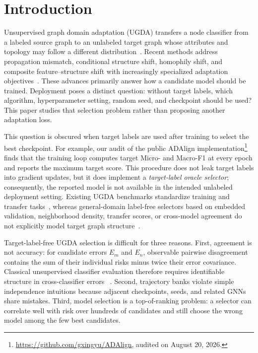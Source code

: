 \section{Introduction}
\label{sec:introduction}

Unsupervised graph domain adaptation (UGDA) transfers a node classifier from a
labeled source graph to an unlabeled target graph whose attributes and topology
may follow a different distribution~\citep{wu2020unsupervised,dai2022graph,liu2023structural}.
Recent methods address propagation mismatch, conditional structure shift,
homophily shift, and composite feature--structure shift with increasingly
specialized adaptation objectives~\citep{liu2023structural,liu2024rethinking,liu2024pairwisealignmentimprovesgraph,fang2025attribute, yang2025disentangled,pmlr-v267-fang25g,chen2026learningadaptivedistributionalignment}.
These advances primarily answer how a candidate model should be trained.
Deployment poses a distinct question: without target labels, which algorithm,
hyperparameter setting, random seed, and checkpoint should be used? This paper
studies that selection problem rather than proposing another adaptation loss.

This question is obscured when target labels are used after training to select
the best checkpoint. For example, our audit of the public ADAlign
implementation\footnote{\url{https://github.com/gxingyu/ADAlign}, audited on
August 20, 2026.} finds that the training loop computes target Micro- and
Macro-F1 at every epoch and reports the maximum target score. This procedure
does not leak target labels into gradient updates, but it does implement a
\emph{target-label oracle selector}; consequently, the reported model is not
available in the intended unlabeled deployment setting. Existing UGDA
benchmarks standardize training and transfer tasks~\citep{liu2024revisitingbenchmarkingunderstandingunsupervised},
whereas general-domain label-free selectors based on embedded validation,
neighborhood density, transfer scores, or cross-model agreement do not
explicitly model target graph structure~\citep{you2019dev,saito2021tunerightwayunsupervised,
yang2023transferscore,jiang2021disagreement,baek2022agreement}.

Target-label-free UGDA selection is difficult for three reasons. First,
agreement is not accuracy: for candidate errors $E_m$ and $E_n$, observable
pairwise disagreement contains the sum of their individual risks minus twice
their error covariance. Classical unsupervised classifier evaluation therefore
requires identifiable structure in cross-classifier errors
~\citep{parisi2014ranking,pmlr-v38-jaffe15}. Second, trajectory banks violate
simple independence intuitions because adjacent checkpoints, seeds, and
related GNNs share mistakes. Third, model selection is a top-of-ranking
problem: a selector can correlate well with risk over hundreds of candidates
and still choose the wrong model among the few best candidates.

